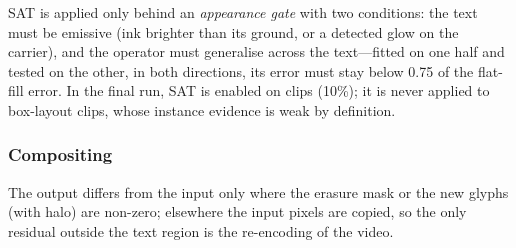SAT is applied only behind an \emph{appearance gate} with two conditions: the text must be emissive (ink brighter than its ground, or a detected glow on the carrier), and the operator must generalise across the text---fitted on one half and tested on the other, in both directions, its error must stay below 0.75 of the flat-fill error. In the final run, SAT is enabled on \rSatOn{} clips (10\%); it is never applied to box-layout clips, whose instance evidence is weak by definition.

\subsubsection{Compositing}
The output differs from the input only where the erasure mask or the new glyphs (with halo) are non-zero; elsewhere the input pixels are copied, so the only residual outside the text region is the re-encoding of the video.
